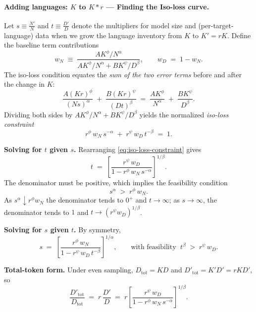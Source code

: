 \paragraph{Adding languages: $K$ to $K*r$ --- Finding the Iso-loss curve.}
Let $s \equiv \tfrac{N'}{N}$ and $t \equiv \tfrac{D'}{D}$ denote the multipliers for model size and (per-target-language) data when we grow the language inventory from $K$ to $K' = rK$.
Define the baseline term contributions
\[
w_N
\;\equiv\;
\frac{A K^{\phi}/N^{\alpha}}
     {A K^{\phi}/N^{\alpha} + B K^{\psi}/D^{\beta}},
\qquad
w_D \;=\; 1 - w_N.
\]
The iso-loss condition equates the \emph{sum of the two error terms} before and after the change in $K$:
\[
\frac{A (Kr)^{\phi}}{(Ns)^{\alpha}} \;+\; \frac{B (Kr)^{\psi}}{(Dt)^{\beta}}
\;=\;
\frac{A K^{\phi}}{N^{\alpha}} \;+\; \frac{B K^{\psi}}{D^{\beta}}.
\]
Dividing both sides by $A K^{\phi}/N^{\alpha} + B K^{\psi}/D^{\beta}$ yields the normalized \emph{iso-loss constraint}
\begin{equation}
r^{\phi}\, w_N\, s^{-\alpha} \;+\; r^{\psi}\, w_D\, t^{-\beta} \;=\; 1.
\label{eq:iso-loss-constraint}
\end{equation}

\textbf{Solving for $t$ given $s$.}
Rearranging \eqref{eq:iso-loss-constraint} gives
\[
t
\;=\;
\left[
\frac{ r^{\psi}\, w_D }
     { 1 - r^{\phi}\, w_N \, s^{-\alpha} }
\right]^{\!1/\beta}.
\]
The denominator must be positive, which implies the feasibility condition
\[
s^{\alpha} \;>\; r^{\phi}\, w_N.
\]
As $s^{\alpha} \downarrow r^{\phi} w_N$ the denominator tends to $0^+$ and $t \to \infty$; as $s \to \infty$, the denominator tends to $1$ and $t \to (r^{\psi} w_D)^{1/\beta}$.

\textbf{Solving for $s$ given $t$.}
By symmetry,
\[
s
\;=\;
\left[
\frac{ r^{\phi}\, w_N }
     { 1 - r^{\psi}\, w_D \, t^{-\beta} }
\right]^{\!1/\alpha},
\qquad
\text{with feasibility } \;
t^{\beta} \;>\; r^{\psi}\, w_D.
\]

\textbf{Total-token form.}
Under even sampling, $D_{\mathrm{tot}} = K D$ and $D'_{\mathrm{tot}} = K' D' = r K D'$, so
\[
\frac{D'_{\mathrm{tot}}}{D_{\mathrm{tot}}}
\;=\;
r \,\frac{D'}{D}
\;=\;
r \left[
\frac{ r^{\psi}\, w_D }
     { 1 - r^{\phi}\, w_N \, s^{-\alpha} }
\right]^{\!1/\beta}.
\]

